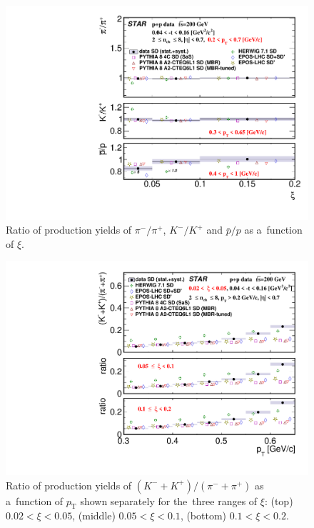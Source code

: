 \begin{figure}[b!]
	\centering
	\includegraphics[width=.99\textwidth,page=1]{chapters/chrgSTAR/img/results/ratio_xi.pdf}
	\caption{Ratio of production yields of $\pi^-/\pi^+$, $K^-/K^+$ and $\bar{p}/p$ as a~function of $\xi$. }
	\label{fig:results_mean_ratio_star}
	
\end{figure}

\begin{figure}[b!]
	\centering
	\includegraphics[width=.99\textwidth,page=1]{chapters/chrgSTAR/img/results/particleRatio_Kpi_.pdf}
	\caption{Ratio of production yields of  $\left(K^-+K^+\right)/\left(\pi^-+\pi^+\right)$ as a~function of $p_\textrm{T}$ shown separately for the~three ranges of $\xi$: (top) $0.02<\xi<0.05$, (middle) $0.05<\xi<0.1$, (bottom) $0.1<\xi<0.2$. }
	\label{fig:results_Kpi_ratio}
	
\end{figure}

